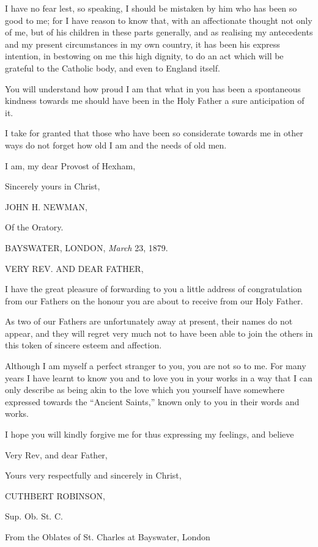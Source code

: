 I have no fear lest, so speaking, I should be mistaken by him who
has been so good to me; for I have reason to know that, with an
affectionate thought not only of me, but of his children in these
parts generally, and as realising my antecedents and my present
circumstances in my own country, it has been his express intention, in
bestowing on me this high dignity, to do an act which will be grateful
to the Catholic body, and even to England itself.

You will understand how proud I am that what in you has been a
spontaneous kindness towards me should have been in the Holy Father a
sure anticipation of it.

I take for granted that those who have been so considerate towards
me in other ways do not forget how old I am and the needs of old men.

I am, my dear Provost of Hexham,

Sincerely yours in Christ,

JOHN H. NEWMAN,

Of the Oratory.


BAYSWATER, LONDON, \emph{March}
23, 1879.

VERY REV. AND
DEAR FATHER,

I have the great pleasure of forwarding to you a little address of
congratulation from our Fathers on the honour you are about to receive
from our Holy Father.

As two of our Fathers are unfortunately away at present, their
names do not appear, and they will regret very much not to have
been able to join the others in this token of sincere esteem and
affection.

Although I am myself a perfect stranger to you, you are not so to
me. For many years I have learnt to know you and to love you in your
works in a way that I can only describe as being akin to the love
which you yourself have somewhere expressed towards the ``Ancient
Saints,'' known only to you in their words and works.

I hope you will kindly forgive me for thus expressing my feelings,
and believe

Very Rev, and dear Father,

Yours very respectfully and sincerely in Christ,

CUTHBERT ROBINSON,

Sup. Ob. St. C.

From the Oblates of St. Charles at Bayswater, London

